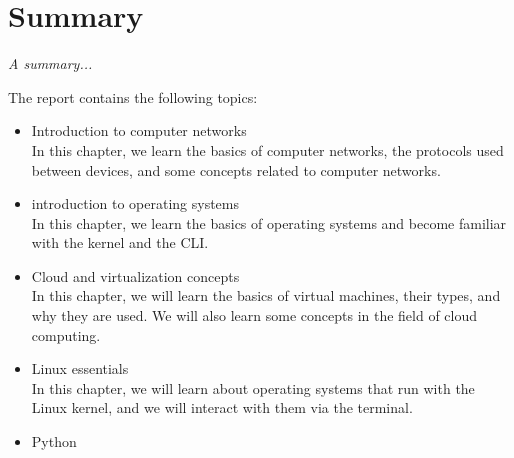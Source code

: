 \chapter*{Summary}

\emph{A summary...}

The report contains the following topics:
\begin{itemize}
	\item Introduction to computer networks\\
	In this chapter, we learn the basics of computer networks, the protocols used between devices, and some concepts related to computer networks.
	\item introduction to operating systems\\
	In this chapter, we learn the basics of operating systems and become familiar with the kernel and the CLI.
	\item Cloud and virtualization concepts\\
	In this chapter, we will learn the basics of virtual machines, their types, and why they are used. We will also learn some concepts in the field of cloud computing.
	\item Linux essentials\\
	In this chapter, we will learn about operating systems that run with the Linux kernel, and we will interact with them via the terminal.
	\item Python 
	
\end{itemize}
